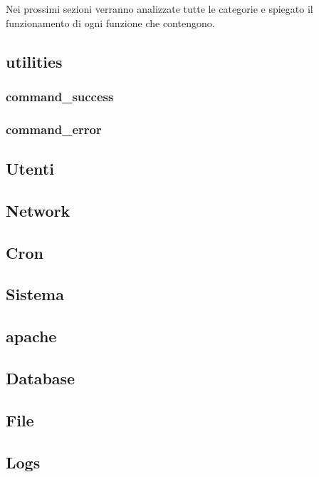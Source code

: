 \documentclass[11pt]{article}
\begin{document}
Nei prossimi sezioni verranno analizzate tutte le categorie e spiegato il funzionamento di ogni funzione che contengono.
\subsection{utilities}
\subsubsection{command\_success}\label{command\_success}
\subsubsection{command\_error}\label{command\_error}
\subsection{Utenti}
\subsection{Network}
\subsection{Cron}
\subsection{Sistema}
\subsection{apache}
\subsection{Database}
\subsection{File}
\subsection{Logs}
\end{document}
